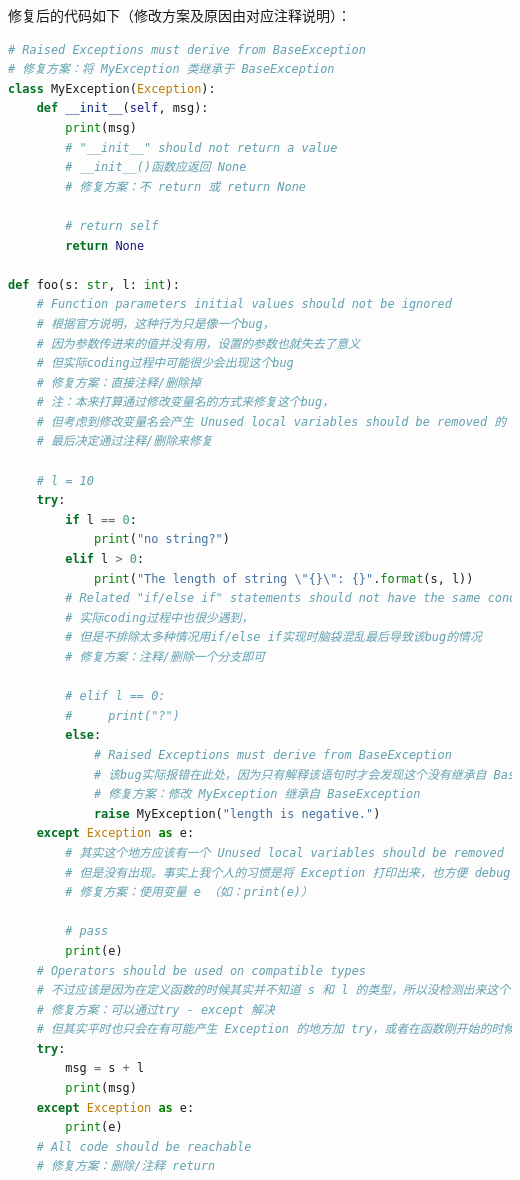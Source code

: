 \documentclass{article}
\begin{document}
\begin{enumerate}[label=\arabic*.]
        修复后的代码如下（修改方案及原因由对应注释说明）：\\
        \begin{lstlisting}[language=python]
# Raised Exceptions must derive from BaseException
# 修复方案：将 MyException 类继承于 BaseException
class MyException(Exception):
    def __init__(self, msg):
        print(msg)
        # "__init__" should not return a value
        # __init__()函数应返回 None
        # 修复方案：不 return 或 return None

        # return self
        return None

def foo(s: str, l: int):
    # Function parameters initial values should not be ignored
    # 根据官方说明，这种行为只是像一个bug，
    # 因为参数传进来的值并没有用，设置的参数也就失去了意义
    # 但实际coding过程中可能很少会出现这个bug
    # 修复方案：直接注释/删除掉
    # 注：本来打算通过修改变量名的方式来修复这个bug，
    # 但考虑到修改变量名会产生 Unused local variables should be removed 的 Code Smell，
    # 最后决定通过注释/删除来修复

    # l = 10
    try:
        if l == 0:
            print("no string?")
        elif l > 0:
            print("The length of string \"{}\": {}".format(s, l))
        # Related "if/else if" statements should not have the same condition
        # 实际coding过程中也很少遇到，
        # 但是不排除太多种情况用if/else if实现时脑袋混乱最后导致该bug的情况
        # 修复方案：注释/删除一个分支即可

        # elif l == 0:
        #     print("?")
        else:
            # Raised Exceptions must derive from BaseException
            # 该bug实际报错在此处，因为只有解释该语句时才会发现这个没有继承自 BaseException 的类被 raise 了
            # 修复方案：修改 MyException 继承自 BaseException
            raise MyException("length is negative.")
    except Exception as e:
        # 其实这个地方应该有一个 Unused local variables should be removed 的 Code Smell 来着（以我个人的理解），
        # 但是没有出现。事实上我个人的习惯是将 Exception 打印出来，也方便 debug
        # 修复方案：使用变量 e （如：print(e)）

        # pass
        print(e)
    # Operators should be used on compatible types
    # 不过应该是因为在定义函数的时候其实并不知道 s 和 l 的类型，所以没检测出来这个 Blocker 的 bug
    # 修复方案：可以通过try - except 解决
    # 但其实平时也只会在有可能产生 Exception 的地方加 try，或者在函数刚开始的时候进行变量类型的检查之类的
    try:
        msg = s + l
        print(msg)
    except Exception as e:
        print(e)
    # All code should be reachable
    # 修复方案：删除/注释 return


\end{lstlisting}
\end{enumerate}
\end{document}
